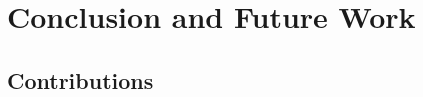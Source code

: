 \chapter{Conclusion and Future Work}
\label{cha:conclusion}

\begin{comment}
What are the main contributions made to the field?
How significant are these contributions?
Also discuss the contributions in terms of the goals and research questions formulated in the Introduction.

The contributions section will normally contain everything that you address in the abstract, but in an extended form and quite possibly additional issues that cannot be included in the abstract.
An obvious difference is that when the reader has come this far in the text, she/he should be quite familiar with the work, but while reading the abstract they will have little to no knowledge of the work.

The section ``Contributions'' in Chapter~\ref{cha:introduction} differs from this one in that the former is just a list of the main bits, while this section should explain them in more detail.
However, basically the same items should appear in both sections.

\section{Future Work}
\label{sec:futureWork}

Consider where you would like to extend or improve this work, or how somebody else could continue it.
These extensions might either be continuing the ongoing direction or taking a side direction that became obvious during the work.
Further, possible solutions to limitations in the work conducted, highlighted in Section~\ref{sec:discussion} may be presented.

Note that in the Specialisation Project Report, the Future Work section will be a key part of your plan for the novel work to be carried out in the next semester,
while in the Master's Thesis, the Future Work section rather will point to issues that others might be interested in addressing.
This can include options and alternatives that you did not try out yourself, or potential improvements and extensions to your experiments or system.
\end{comment}

\section{Contributions}
\label{sec:contributions}

